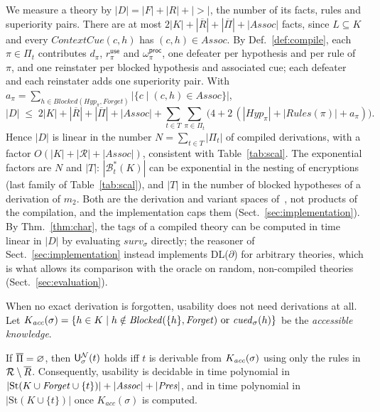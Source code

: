 \begin{remark}\label{rem:size}
We measure a theory by $|D|=|F|+|R|+|{>}|$, the number of its facts, rules and superiority pairs. There are at most $2|K|+|\overline{R}|+|\overline{\Pi}|+|\mathit{Assoc}|$ facts, since $L\subseteq K$ and every $\mathit{ContextCue}(c,h)$ has $(c,h)\in\mathit{Assoc}$. By Def.~\ref{def:compile}, each $\pi\in\Pi_t$ contributes $d_\pi$, $r^{\mathsf{use}}_\pi$ and $\omega^{\mathsf{proc}}_\pi$, one defeater per hypothesis and per rule of $\pi$, and one reinstater per blocked hypothesis and associated cue; each defeater and each reinstater adds one superiority pair. With $a_\pi=\sum_{h\in\mathit{Blocked}(\mathit{Hyp}_\pi,\mathit{Forget})} |\{c \mid (c,h)\in\mathit{Assoc}\}|$,
\[
  |D| \;\le\; 2|K| + |\overline{R}| + |\overline{\Pi}| + |\mathit{Assoc}|
  + \sum_{t\in T}\sum_{\pi\in\Pi_t}
    \bigl(4 + 2\,(|\mathit{Hyp}_\pi| + |\mathit{Rules}(\pi)| + a_\pi)\bigr).
\]
Hence $|D|$ is linear in the number $N=\sum_{t\in T}|\Pi_t|$ of compiled derivations, with a factor $O(|K|+|\mathcal R|+|\mathit{Assoc}|)$, consistent with Table~\ref{tab:scal}. The exponential factors are $N$ and $|T|$: $|\mathcal B^*_t(K)|$ can be exponential in the nesting of encryptions (last family of Table~\ref{tab:scal}), and $|T|$ in the number of blocked hypotheses of a derivation of $m_2$. Both are the derivation and variant spaces of~\cite{sandu2026formal}, not products of the compilation, and the implementation caps them (Sect.~\ref{sec:implementation}). By Thm.~\ref{thm:char}, the tags of a compiled theory can be computed in time linear in $|D|$ by evaluating $\mathit{surv}_\sigma$ directly; the reasoner of Sect.~\ref{sec:implementation} instead implements DL($\partial$) for arbitrary theories, which is what allows its comparison with the oracle on random, non-compiled theories (Sect.~\ref{sec:evaluation}).
\end{remark}

When no exact derivation is forgotten, usability does not need derivations at all. Let $K_{\mathit{acc}}(\sigma)=\{h\in K\mid h\notin\mathit{Blocked}(\{h\},\mathit{Forget})\text{ or }\mathit{cued}_\sigma(h)\}$ be the \emph{accessible knowledge}.

\begin{theorem}\label{thm:poly}
If $\overline{\Pi}=\varnothing$, then $\mathsf{U}^{\mathcal{N}}_{\sigma}(t)$ holds iff $t$ is derivable from $K_{\mathit{acc}}(\sigma)$ using only the rules in $\mathcal{R}\setminus\overline{R}$. Consequently, usability is decidable in time polynomial in $|\mathrm{St}(K\cup\mathit{Forget}\cup\{t\})|+|\mathit{Assoc}|+|\mathit{Pres}|$, and in time polynomial in $|\mathrm{St}(K\cup\{t\})|$ once $K_{\mathit{acc}}(\sigma)$ is computed.
\end{theorem}

